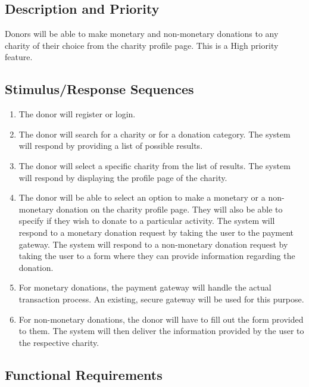 \documentclass{scrreprt}
\begin{document}
\vspace{1cm}

\subsection{Description and Priority}

Donors will be able to make monetary and non-monetary donations to any charity of their choice from the charity profile page. This is a High priority feature.\\

\subsection{Stimulus/Response Sequences}

\begin{enumerate}[label=(\alph*)]
\item The donor will register or login.
\item The donor will search for a charity or for a donation category. The system will respond by providing a list of possible results.
\item The donor will select a specific charity from the list of results. The system will respond by displaying the profile page of the charity.
\item The donor will be able to select an option to make a monetary or a non-monetary donation on the charity profile page. They will also be able to specify if they wish to donate to a particular activity. The system will respond to a monetary donation request by taking the user to the payment gateway. The system will respond to a non-monetary donation request by taking the user to a form where they can provide information regarding the donation.
\item For monetary donations, the payment gateway will handle the actual transaction process. An existing, secure gateway will be used for this purpose.
\item For non-monetary donations, the donor will have to fill out the form provided to them. The system will then deliver the information provided by the user to the respective charity.\\

\end{enumerate}

\clearpage

\subsection{Functional Requirements}
\end{document}
